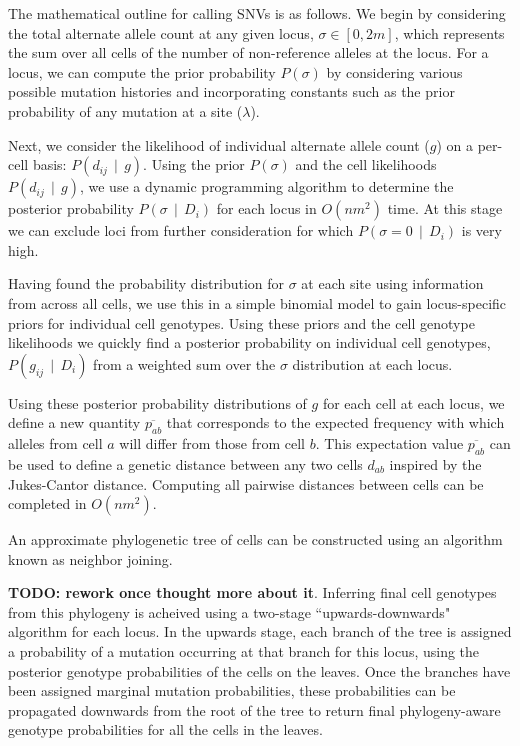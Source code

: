 \documentclass[../../main.tex]{subfiles}
\begin{document}
The mathematical outline for calling SNVs is as follows.
We begin by considering the total alternate allele count at any given locus, $\sigma\in [0,2m]$, which represents the sum over all cells of the number of non-reference alleles at the locus.
For a locus, we can compute the prior probability $P(\sigma)$ by considering various possible mutation histories and incorporating constants such as the prior probability of any mutation at a site ($\lambda$).

Next, we consider the likelihood of individual alternate allele count ($g$) on a per-cell basis: $P(d_{ij}\,\mid\,g)$.
Using the prior $P(\sigma)$ and the cell likelihoods $P(d_{ij}\,\mid\,g)$, we use a dynamic programming algorithm to determine the posterior probability $P(\sigma\,\mid\,D_i)$ for each locus in $O(nm^2)$ time.
At this stage we can exclude loci from further consideration for which $P(\sigma = 0\,\mid\, D_i)$ is very high.

Having found the probability distribution for $\sigma$ at each site using information from across all cells, we use this in a simple binomial model to gain locus-specific priors for individual cell genotypes.
Using these priors and the cell genotype likelihoods we quickly find a posterior probability on individual cell genotypes, $P(g_{ij}\,\mid\, D_i)$ from a weighted sum over the $\sigma$ distribution at each locus.

Using these posterior probability distributions of $g$ for each cell at each locus, we define a new quantity $\overline{p_{ab}}$ that corresponds to the expected frequency with which alleles from cell $a$ will differ from those from cell $b$.
This expectation value $\overline{p_{ab}}$ can be used to define a genetic distance between any two cells $d_{ab}$ inspired by the Jukes-Cantor distance.
Computing all pairwise distances between cells can be completed in $O(nm^2)$.

An approximate phylogenetic tree of cells can be constructed using an algorithm known as neighbor joining.

\textbf{TODO: rework once thought more about it}. 
Inferring final cell genotypes from this phylogeny is acheived using a two-stage ``upwards-downwards" algorithm for each locus.
In the upwards stage, each branch of the tree is assigned a probability of a mutation occurring at that branch for this locus, using the posterior genotype probabilities of the cells on the leaves.
Once the branches have been assigned marginal mutation probabilities, these probabilities can be propagated downwards from the root of the tree to return final phylogeny-aware genotype probabilities for all the cells in the leaves.
\end{document}
